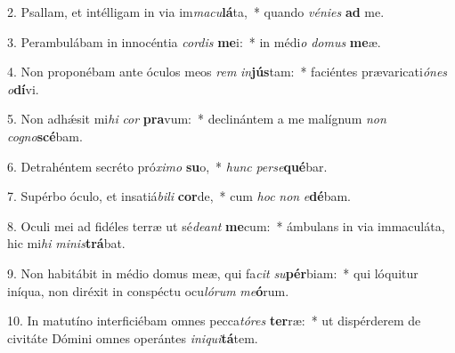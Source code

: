 2. Psallam, et intélligam in via im\textit{ma}\textit{cu}\textbf{lá}ta,~*  quando \textit{vé}\textit{ni}\textit{es} \textbf{ad} me.\

3. Perambulábam in innocéntia \textit{cor}\textit{dis} \textbf{me}i:~*  in médi\textit{o} \textit{do}\textit{mus} \textbf{me}æ.\

4. Non proponébam ante óculos meos \textit{rem} \textit{in}\textbf{jús}tam:~*  faciéntes prævaricati\textit{ó}\textit{nes} \textit{o}\textbf{dí}vi.\

5. Non adhǽsit mi\textit{hi} \textit{cor} \textbf{pra}vum:~*  declinántem a me malígnum \textit{non} \textit{co}\textit{gno}\textbf{scé}bam.\

6. Detrahéntem secréto pró\textit{xi}\textit{mo} \textbf{su}o,~*  \textit{hunc} \textit{per}\textit{se}\textbf{qué}bar.\

7. Supérbo óculo, et insatiá\textit{bi}\textit{li} \textbf{cor}de,~*  cum \textit{hoc} \textit{non} \textit{e}\textbf{dé}bam.\

8. Oculi mei ad fidéles terræ ut sé\textit{de}\textit{ant} \textbf{me}cum:~*  ámbulans in via immaculáta, hic mi\textit{hi} \textit{mi}\textit{nis}\textbf{trá}bat.\

9. Non habitábit in médio domus meæ, qui fa\textit{cit} \textit{su}\textbf{pér}biam:~*  qui lóquitur iníqua, non diréxit in conspéctu ocu\textit{ló}\textit{rum} \textit{me}\textbf{ó}rum.\

10. In matutíno interficiébam omnes pecca\textit{tó}\textit{res} \textbf{ter}ræ:~*  ut dispérderem de civitáte Dómini omnes operántes \textit{in}\textit{i}\textit{qui}\textbf{tá}tem.\

